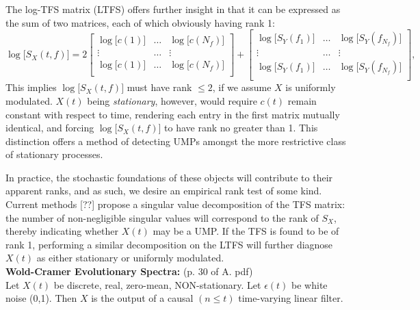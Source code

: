 \documentclass{article}
\begin{document}
{The log-TFS matrix (LTFS) offers further insight in that it can be expressed as the sum of two matrices, each of which obviously having rank 1:
\begin{equation}
    \log \Big[S_X(t,f)\Big] = 2
    \begin{bmatrix}
        \log \big[c(1)\big]    & \dots & \log \big[c(N_f)\big] \\
        \vdots  & \dots & \vdots \\
        \log \big[c(1)\big]    & \dots & \log \big[c(N_f)\big] \\
    \end{bmatrix}
    +
    \begin{bmatrix}
        \log \big[S_Y(f_1)\big]    & \dots & \log \big[S_Y(f_{N_f})\big] \\
        \vdots  & \dots & \vdots \\
        \log \big[S_Y(f_1)\big]    & \dots & \log \big[S_Y(f_{N_f})\big] \\
    \end{bmatrix},
\end{equation}
This implies $\log\big[S_X(t,f)\big]$ must have rank $\leq 2$, if we assume $X$ is uniformly modulated. $X(t)$ being \textit{stationary}, however, would require $c(t)$ remain constant with respect to time, rendering each entry in the first matrix mutually identical, and forcing $\log\big[S_X(t,f)\big]$ to have rank no greater than 1. This distinction offers a method of detecting UMPs amongst the more restrictive class of stationary processes.

In practice, the stochastic foundations of these objects will contribute to their apparent ranks, and as such, we desire an empirical rank test of some kind. Current methods [??] propose a singular value decomposition of the TFS matrix: the number of non-negligible singular values will correspond to the rank of $S_X$, thereby indicating whether $X(t)$ may be a UMP. If the TFS is found to be of rank 1, performing a similar decomposition on the LTFS will further diagnose $X(t)$ as either stationary or uniformly modulated.\\

\textbf{Wold-Cramer Evolutionary Spectra:}  (p. 30 of A. pdf)\\
Let $X(t)$ be discrete, real, zero-mean, NON-stationary. Let $\epsilon(t)$ be white noise (0,1).
Then $X$ is the output of a causal $(n\leq t)$ time-varying linear filter.

}
\end{document}
